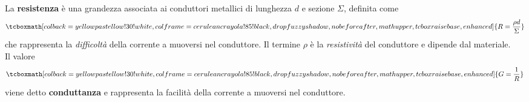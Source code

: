 \begin{define}
	La \textbf{resistenza} è una grandezza associata ai conduttori metallici di lunghezza $d$ e sezione $\Sigma$, definita come
	\begin{equation*}
		\tcboxmath[colback=yellowpastellow!30!white,colframe=ceruleancrayola!85!black,drop fuzzy shadow, nobeforeafter, math upper, tcbox raise base, enhanced]{R=\frac{\rho d}{\Sigma}}
	\end{equation*}
	che rappresenta la \textit{difficoltà} della corrente a muoversi nel conduttore. Il termine $\rho$ è la \textit{resistività} del conduttore e dipende dal materiale.\\
	Il valore
	\begin{equation}
			\tcboxmath[colback=yellowpastellow!30!white,colframe=ceruleancrayola!85!black,drop fuzzy shadow, nobeforeafter, math upper, tcbox raise base, enhanced]{G=\frac{1}{R}}
	\end{equation}
	viene detto \textbf{conduttanza} e rappresenta la facilità della corrente a muoversi nel conduttore.
\end{define}
